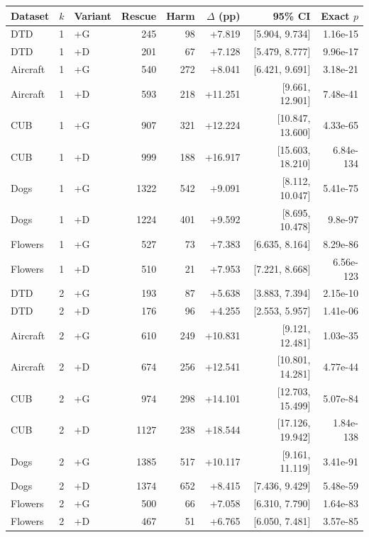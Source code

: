 \begin{tabular}{lllrrrrr}
\toprule
Dataset & $k$ & Variant & Rescue & Harm & $\Delta$ (pp) & 95\% CI & Exact $p$ \\
\midrule
DTD & 1 & +G & 245 & 98 & +7.819 & [5.904, 9.734] & 1.16e-15 \\
DTD & 1 & +D & 201 & 67 & +7.128 & [5.479, 8.777] & 9.96e-17 \\
Aircraft & 1 & +G & 540 & 272 & +8.041 & [6.421, 9.691] & 3.18e-21 \\
Aircraft & 1 & +D & 593 & 218 & +11.251 & [9.661, 12.901] & 7.48e-41 \\
CUB & 1 & +G & 907 & 321 & +12.224 & [10.847, 13.600] & 4.33e-65 \\
CUB & 1 & +D & 999 & 188 & +16.917 & [15.603, 18.210] & 6.84e-134 \\
Dogs & 1 & +G & 1322 & 542 & +9.091 & [8.112, 10.047] & 5.41e-75 \\
Dogs & 1 & +D & 1224 & 401 & +9.592 & [8.695, 10.478] & 9.8e-97 \\
Flowers & 1 & +G & 527 & 73 & +7.383 & [6.635, 8.164] & 8.29e-86 \\
Flowers & 1 & +D & 510 & 21 & +7.953 & [7.221, 8.668] & 6.56e-123 \\
DTD & 2 & +G & 193 & 87 & +5.638 & [3.883, 7.394] & 2.15e-10 \\
DTD & 2 & +D & 176 & 96 & +4.255 & [2.553, 5.957] & 1.41e-06 \\
Aircraft & 2 & +G & 610 & 249 & +10.831 & [9.121, 12.481] & 1.03e-35 \\
Aircraft & 2 & +D & 674 & 256 & +12.541 & [10.801, 14.281] & 4.77e-44 \\
CUB & 2 & +G & 974 & 298 & +14.101 & [12.703, 15.499] & 5.07e-84 \\
CUB & 2 & +D & 1127 & 238 & +18.544 & [17.126, 19.942] & 1.84e-138 \\
Dogs & 2 & +G & 1385 & 517 & +10.117 & [9.161, 11.119] & 3.41e-91 \\
Dogs & 2 & +D & 1374 & 652 & +8.415 & [7.436, 9.429] & 5.48e-59 \\
Flowers & 2 & +G & 500 & 66 & +7.058 & [6.310, 7.790] & 1.64e-83 \\
Flowers & 2 & +D & 467 & 51 & +6.765 & [6.050, 7.481] & 3.57e-85 \\
\bottomrule
\end{tabular}
